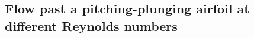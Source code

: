 


\clearpage
\subsection{Flow past a pitching-plunging airfoil at different Reynolds numbers}\label{sec:pitchingPlungingAirfoilWithDifferentReynolds}



